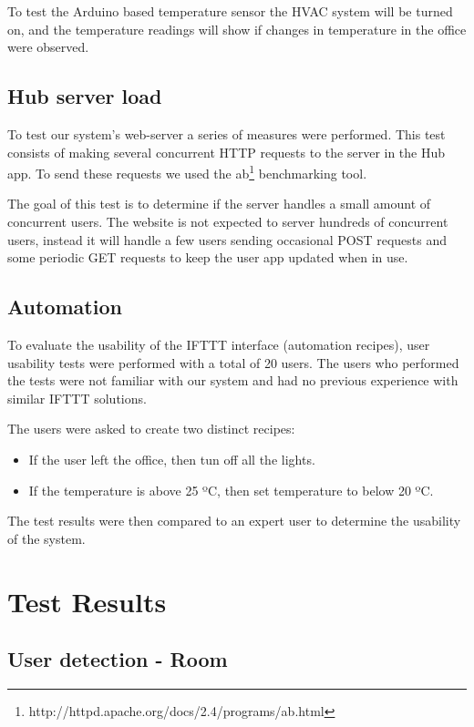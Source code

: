 To test the Arduino based temperature sensor the \ac{HVAC} system will be turned on, and the temperature readings will show if changes in temperature in the office were observed.


\subsection{Hub server load}


To test our system's web-server a series of measures were performed. This test consists of making several concurrent \ac{HTTP} requests to the server in the Hub app. To send these requests we used the \ac{ab}\footnote{http://httpd.apache.org/docs/2.4/programs/ab.html} benchmarking tool.

The goal of this test is to determine if the server handles a small amount of concurrent users. The website is not expected to server hundreds of concurrent users, instead it will handle a few users sending occasional POST requests and some periodic GET requests to keep the user app updated when in use.


\subsection{Automation}

To evaluate the usability of the \ac{IFTTT} interface (automation recipes), user usability tests were performed with a total of 20 users. The users who performed the tests were not familiar with our system and had no previous experience with similar \ac{IFTTT} solutions.

The users were asked to create two distinct recipes:

\begin{itemize}
  \item If the user left the office, then tun off all the lights.
  \item If the temperature is above 25 ºC, then set temperature to below 20 ºC. 
\end{itemize} 

The test results were then compared to an expert user to determine the usability of the system.



\section{Test Results}


\subsection{User detection - Room}

